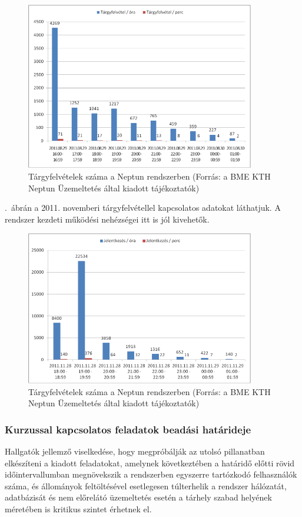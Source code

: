 \begin{figure}[!ht]
\centering
\includegraphics[width=100mm, keepaspectratio]{figures/neptun_004.png}
\caption{Tárgyfelvételek száma a Neptun rendszerben (Forrás: a BME KTH Neptun Üzemeltetés által kiadott tájékoztatók)}
\label{fig:neptun_004}
\end{figure}

.~ábrán a 2011. novemberi tárgyfelvétellel kapcsolatos adatokat láthatjuk. A rendszer kezdeti működési nehézségei itt is jól kivehetők.

\begin{figure}[!ht]
\centering
\includegraphics[width=100mm, keepaspectratio]{figures/neptun_005.png}
\caption{Tárgyfelvételek száma a Neptun rendszerben (Forrás: a BME KTH Neptun Üzemeltetés által kiadott tájékoztatók)}
\label{fig:neptun_005}
\end{figure}

\subsubsection{Kurzussal kapcsolatos feladatok beadási határideje}

Hallgatók jellemző viselkedése, hogy megpróbálják az utolsó pillanatban elkészíteni a kiadott feladatokat, amelynek következtében a határidő előtti rövid időintervallumban megnövekszik a rendszerben egyszerre tartózkodó felhasználók száma, és állományok feltöltésével esetlegesen túlterhelik a rendszer hálózatát, adatbázisát és nem előrelátó üzemeltetés esetén a tárhely szabad helyének méretében is kritikus szintet érhetnek el.

